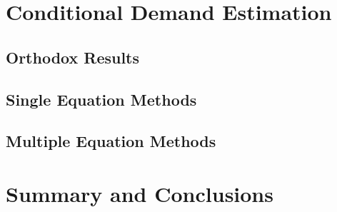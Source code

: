 \documentclass{article}
\begin{document}
\section{Conditional Demand Estimation}

  \subsection{Orthodox Results}
  \subsection{Single Equation Methods}
  \subsection{Multiple Equation Methods}
  
\section{Summary and Conclusions}

\nocite{*}


\end{document}
